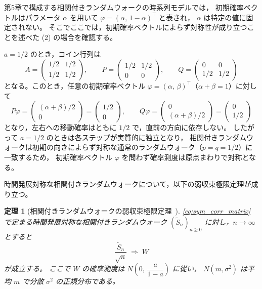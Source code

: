 \documentclass[a4j,dvipdfmx]{jsarticle}
\theoremstyle{plainnote}
\newtheorem{theorem}{定理}[section]
\begin{document}
第5章で構成する相関付きランダムウォークの時系列モデルでは，
初期確率ベクトルはパラメータ $\alpha$ を用いて
$\varphi = (\alpha,\,1-\alpha)^\top$ と表され，
$\alpha$ は特定の値に固定されない。
そこでここでは，初期確率ベクトルによらず対称性が成り立つことを述べた
(2) の場合を確認する。

$a = 1/2$ のとき，コイン行列は
\[
  A = \begin{pmatrix} 1/2 & 1/2 \\ 1/2 & 1/2 \end{pmatrix}, \qquad
  P = \begin{pmatrix} 1/2 & 1/2 \\ 0 & 0 \end{pmatrix}, \qquad
  Q = \begin{pmatrix} 0 & 0 \\ 1/2 & 1/2 \end{pmatrix}
\]
となる。このとき，任意の初期確率ベクトル $\varphi = (\alpha,\,\beta)^\top$（$\alpha + \beta = 1$）に対して
\[
  P\varphi = \begin{pmatrix} (\alpha+\beta)/2 \\ 0 \end{pmatrix} = \begin{pmatrix} 1/2 \\ 0 \end{pmatrix}, \qquad
  Q\varphi = \begin{pmatrix} 0 \\ (\alpha+\beta)/2 \end{pmatrix} = \begin{pmatrix} 0 \\ 1/2 \end{pmatrix}
\]
となり，左右への移動確率はともに $1/2$ で，直前の方向に依存しない。
したがって $a = 1/2$ のときは各ステップが実質的に独立となり，
相関付きランダムウォークは初期の向きによらず対称な通常のランダムウォーク（$p=q=1/2$）に一致するため，
初期確率ベクトル $\varphi$ を問わず確率測度は原点まわりで対称となる。

時間発展対称な相関付きランダムウォークについて，以下の弱収束極限定理が成り立つ。

\begin{theorem}[相関付きランダムウォークの弱収束極限定理~{\cite{refbook}}]
\label{thm:clt_corr}
\eqref{eq:sym_corr_matrix} で定まる時間発展対称な相関付きランダムウォーク $(\tilde{S}_n)_{n \geq 0}$ に対し，$n \to \infty$ とすると
\begin{equation}
  \frac{\tilde{S}_n}{\sqrt{n}} \;\Rightarrow\; W
  \label{eq:clt_corr}
\end{equation}
が成立する。
ここで $W$ の確率測度は $N\!\left(0,\,\dfrac{a}{1-a}\right)$ に従い，
$N(m,\sigma^2)$ は平均 $m$ で分散 $\sigma^2$ の正規分布である。
\end{theorem}
\end{document}
